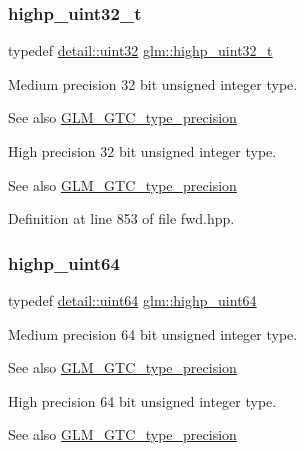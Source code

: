 \subsubsection{\texorpdfstring{highp\+\_\+uint32\+\_\+t}{highp\_uint32\_t}}
{\footnotesize\ttfamily typedef \hyperlink{namespaceglm_1_1detail_ade6cfbf377022aaa391af8cd50489222}{detail\+::uint32} \hyperlink{group__gtc__type__precision_ga8eb85ad460079c63b68866ae34637bda}{glm\+::highp\+\_\+uint32\+\_\+t}}

Medium precision 32 bit unsigned integer type. \begin{DoxySeeAlso}{See also}
\hyperlink{group__gtc__type__precision}{G\+L\+M\+\_\+\+G\+T\+C\+\_\+type\+\_\+precision}
\end{DoxySeeAlso}
High precision 32 bit unsigned integer type. \begin{DoxySeeAlso}{See also}
\hyperlink{group__gtc__type__precision}{G\+L\+M\+\_\+\+G\+T\+C\+\_\+type\+\_\+precision} 
\end{DoxySeeAlso}


Definition at line 853 of file fwd.\+hpp.

\mbox{\label{group__gtc__type__precision_ga8079c653e20cda03d34b99de629a7b09}} 
\subsubsection{\texorpdfstring{highp\+\_\+uint64}{highp\_uint64}}
{\footnotesize\ttfamily typedef \hyperlink{namespaceglm_1_1detail_adec4b19bf4982125e122db2fe03c5810}{detail\+::uint64} \hyperlink{group__gtc__type__precision_ga8079c653e20cda03d34b99de629a7b09}{glm\+::highp\+\_\+uint64}}

Medium precision 64 bit unsigned integer type. \begin{DoxySeeAlso}{See also}
\hyperlink{group__gtc__type__precision}{G\+L\+M\+\_\+\+G\+T\+C\+\_\+type\+\_\+precision}
\end{DoxySeeAlso}
High precision 64 bit unsigned integer type. \begin{DoxySeeAlso}{See also}
\hyperlink{group__gtc__type__precision}{G\+L\+M\+\_\+\+G\+T\+C\+\_\+type\+\_\+precision} 
\end{DoxySeeAlso}


